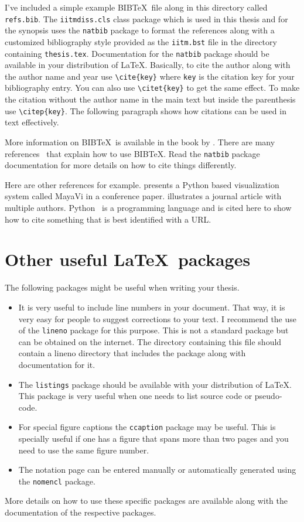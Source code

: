 	I've included a simple example BIB\TeX\ file along in this directory
	called \verb+refs.bib+.  The \verb+iitmdiss.cls+ class package which
	is used in this thesis and for the synopsis uses the \verb+natbib+
	package to format the references along with a customized bibliography
	style provided as the \verb+iitm.bst+ file in the directory containing
	\verb+thesis.tex+.  Documentation for the \verb+natbib+ package should
	be available in your distribution of \LaTeX.  Basically, to cite the
	author along with the author name and year use \verb+\cite{key}+ where
	\verb+key+ is the citation key for your bibliography entry.  You can
	also use \verb+\citet{key}+ to get the same effect.  To make the
	citation without the author name in the main text but inside the
	parenthesis use \verb+\citep{key}+.  The following paragraph shows how
	citations can be used in text effectively.
	
	More information on BIB\TeX\ is available in the book by
	\cite{lamport:86}.  There are many
	references~\cite{lamport:86,prabhu:xx} that explain how to use
	BIB\TeX.  Read the \verb+natbib+ package documentation for more
	details on how to cite things differently.
	
	Here are other references for example.  \cite{viz:mayavi} presents a
	Python based visualization system called MayaVi in a conference paper.
	\cite{pan:pr:flat-fst} illustrates a journal article with multiple
	authors.  Python~\cite{py:python} is a programming language and is
	cited here to show how to cite something that is best identified with
	a URL.
	
	\section{Other useful \LaTeX\ packages}
	
	The following packages might be useful when writing your thesis.
	
	\begin{itemize}  
		\item It is very useful to include line numbers in your document.
		That way, it is very easy for people to suggest corrections to your
		text.  I recommend the use of the \texttt{lineno} package for this
		purpose.  This is not a standard package but can be obtained on the
		internet.  The directory containing this file should contain a
		lineno directory that includes the package along with documentation
		for it.
		
		\item The \texttt{listings} package should be available with your
		distribution of \LaTeX.  This package is very useful when one needs
		to list source code or pseudo-code.
		
		\item For special figure captions the \texttt{ccaption} package may be
		useful.  This is specially useful if one has a figure that spans
		more than two pages and you need to use the same figure number.
		
		\item The notation page can be entered manually or automatically
		generated using the \texttt{nomencl} package.
		
	\end{itemize}
	
	More details on how to use these specific packages are available along
	with the documentation of the respective packages.